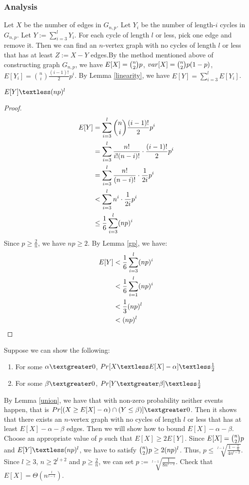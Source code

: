 \subsubsection{Analysis}\label{Analysis} 
Let $X$ be the number of edges in $G_{n,p}$. Let $Y_i$ be the number of length-$i$ cycles in $G_{n,p}$. Let $Y:=\sum_{i=3}^{l}Y_i$.
For each cycle of length $l$ or less, pick one edge and remove it.
Then we can find an $n$-vertex graph with no cycles of length $l$ or less that has at least $Z:=X-Y$ edges.By the method mentioned above of constructing graph $G_{n,p}$, we have $E[X]=\tbinom{n}{2}p$, $var[X]=\tbinom{n}{2}p(1-p)$, $E[Y_i]=\binom{n}{i}\frac{(i-1)!}{2}p^i$. By Lemma \ref{linearity}, we have $E[Y]=\sum_{i=3}^{l}E[Y_i]$.
\begin{claim}
$E[Y]\textless (np)^l$
\end{claim}
\begin{proof}
\begin{align}
\nonumber E[Y]&=\sum_{i=3}^{l} \binom{n}{i}\frac{(i-1)!}{2}p^i\\
\nonumber &=\sum_{i=3}^{l} \frac{n!}{i!(n-i)!}\cdot\frac{(i-1)!}{2}p^i\\
\nonumber &=\sum_{i=3}^{l} \frac{n!}{(n-i)!}\cdot\frac{1}{2i}p^i\\
\nonumber &\textless \sum_{i=3}^{l}n^i\cdot\frac{1}{2i}p^i\\
\nonumber &\le \frac{1}{6} \sum_{i=3}^{l}(np)^i
\end{align}
Since $p \ge \frac{2}{n}$, we have $np\ge 2$.
By Lemma \ref{gp}, we have:
\begin{align}
    \nonumber E[Y]& \textless   \frac{1}{6}\sum_{i=3}^{l}(np)^i \\
    \nonumber & \textless \frac{1}{6}\sum_{i=1}^{l}(np)^i \\
    \nonumber & \textless \frac{1}{3}(np)^l\\
    \nonumber & \textless (np)^l
\end{align}
\end{proof}
Suppose we can show the following:
\begin{enumerate}
    \item For some $\alpha \textgreater 0$, $Pr[X\textless E[X]-\alpha] \textless \frac{1}{2}$
    \item For some $\beta \textgreater 0$, $Pr[Y \textgreater \beta]\textless \frac{1}{2}$
\end{enumerate}
By Lemma \ref{union}, we have that with non-zero probability neither events happen, that is $Pr[(X\ge E[X]-\alpha)\cap (Y \le \beta)]\textgreater 0$. Then it shows that there exists an $n$-vertex graph with no cycles of length $l$ or less that has at least $E[X]-\alpha-\beta$ edges. 
Then we will show how to bound $E[X]-\alpha-\beta$.
Choose an appropriate value of $p$ such that $E[X] \ge 2E[Y]$. Since $E[X]=\tbinom{n}{2}p$ and $E[Y]\textless (np)^l$, we have to satisfy $\tbinom{n}{2}p \ge 2(np)^l$. Thus, $p\le  \sqrt[l-1]{\frac{1-\frac{1}{n}}{4n^{l-2}}}$. Since $l\ge 3$, $n\ge 2^{l+2}$ and $p\ge \frac{2}{n}$, we can set $p:=\sqrt[l-1]{\frac{1}{8n^{l-2}}}$. Check that $E[X]=\Theta (n^\frac{l}{l-1})$.%

